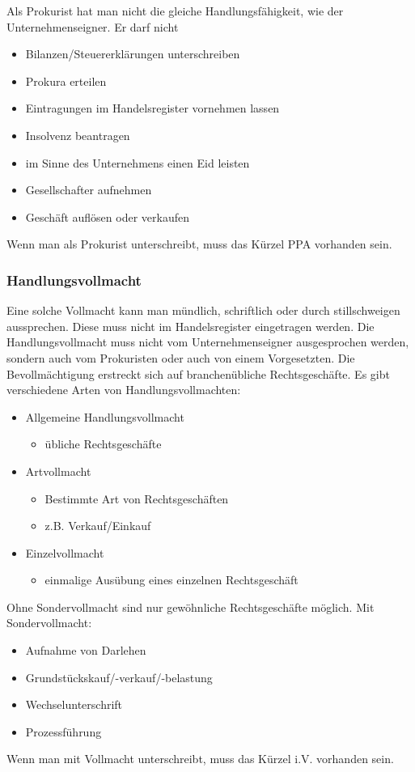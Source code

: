 \documentclass[]{article}
\begin{document}
Als Prokurist hat man nicht die gleiche Handlungsfähigkeit, wie der Unternehmenseigner. Er darf nicht
\begin{itemize}
	\item Bilanzen/Steuererklärungen unterschreiben
	\item Prokura erteilen
	\item Eintragungen im Handelsregister vornehmen lassen
	\item Insolvenz beantragen
	\item im Sinne des Unternehmens einen Eid leisten
	\item Gesellschafter aufnehmen
	\item Geschäft auflösen oder verkaufen
\end{itemize}

Wenn man als Prokurist unterschreibt, muss das Kürzel PPA vorhanden sein.

\subsubsection{Handlungsvollmacht}
Eine solche Vollmacht kann man mündlich, schriftlich oder durch stillschweigen aussprechen. Diese muss nicht im Handelsregister eingetragen werden. Die Handlungsvollmacht muss nicht vom Unternehmenseigner ausgesprochen werden, sondern auch vom Prokuristen oder auch von einem Vorgesetzten. Die Bevollmächtigung erstreckt sich auf branchenübliche Rechtsgeschäfte. Es gibt verschiedene Arten von Handlungsvollmachten:
\begin{itemize}
	\item Allgemeine Handlungsvollmacht
	\begin{itemize}
		\item übliche Rechtsgeschäfte
	\end{itemize}
	\item Artvollmacht
	\begin{itemize}
		\item Bestimmte Art von Rechtsgeschäften
		\item z.B. Verkauf/Einkauf
	\end{itemize}
	\item Einzelvollmacht
	\begin{itemize}
		\item einmalige Ausübung eines einzelnen Rechtsgeschäft
	\end{itemize}
\end{itemize}

Ohne Sondervollmacht sind nur gewöhnliche Rechtsgeschäfte möglich. Mit Sondervollmacht:
\begin{itemize}
	\item Aufnahme von Darlehen
	\item Grundstückskauf/-verkauf/-belastung
	\item Wechselunterschrift
	\item Prozessführung
\end{itemize}

Wenn man mit Vollmacht unterschreibt, muss das Kürzel i.V. vorhanden sein.
\end{document}
